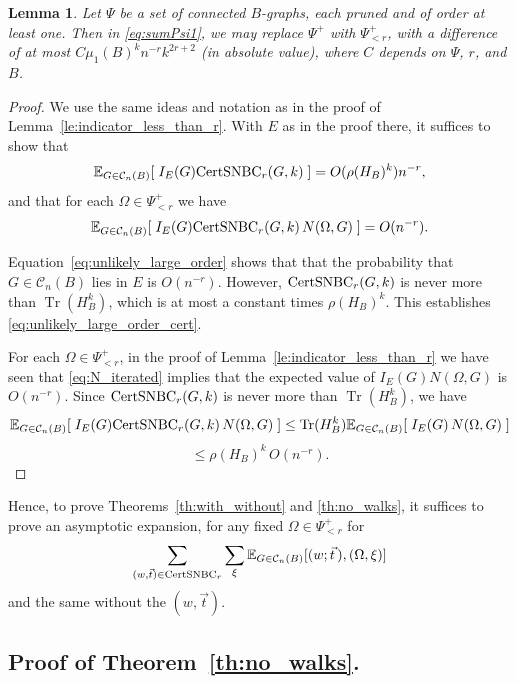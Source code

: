 \documentclass{memo-l}
\newcommand{\nonsigma}{\xi}
\theoremstyle{plain}
\theoremstyle{definition}
\numberwithin{section}{chapter}
\numberwithin{equation}{chapter}
\newcommand{\expect}[2]{{\mathbb{E}}_{#1}{\left[\; #2\; \right]}}
\DeclareMathOperator{\Tr}{Tr}
\newcommand{\potwalk}{(w;\vec t\,)}
\theoremstyle{plain}
\newtheorem{lem}[theorem]{Lemma}
\theoremstyle{definition}
\newcommand\EE{\mathbb{E}}
\newcommand\cC{\mathcal{C}}
\begin{document}
\begin{lem}\label{le:truncate_Psi_at_r}
Let \( \Psi \) be a set of connected 
\( B \)-graphs, each pruned and of order at
least one. 
Then in \eqref{eq:sumPsi1}, we may replace \( \Psi^+ \) with \(
\Psi^+_{<r} \), with a difference of at most \( C\mu_1(B)^k n^{-r}k^{2r+2} \)
(in absolute value),
where $C$ depends on $\Psi$, $r$, and $B$.
\end{lem} 
\begin{proof}
We use the same ideas and notation as in the proof
of Lemma~\ref{le:indicator_less_than_r}.  With $E$ as in the proof there,
it suffices to show that
\begin{equation}\label{eq:unlikely_large_order_cert}
\expect{G\in\cC_n(B)}{I_E(G) {\rm CertSNBC}_r(G,k) } = O(\rho(H_B)^k) n^{-r} ,
\end{equation}
and that for each $\Omega\in\Psi^+_{<r}$ we have
\begin{equation}\label{eq:unlikely_large_cert}
\expect{G\in\cC_n(B)}{I_E(G) {\rm CertSNBC}_r(G,k)\, N(\Omega,G) }
= O(n^{-r}).
\end{equation}

Equation~\ref{eq:unlikely_large_order} shows that
that the probability that $G\in\cC_n(B)$ lies in $E$ is
$O(n^{-r})$.  However, 
${\rm CertSNBC}_r(G,k)$ is never more than $\Tr(H_B^k)$, which
is at most a constant times $\rho(H_B)^k$.  This establishes
\eqref{eq:unlikely_large_order_cert}.

For each $\Omega\in\Psi^+_{<r}$, in the proof of
Lemma~\ref{le:indicator_less_than_r} we have seen that
\eqref{eq:N_iterated}
implies that the expected value of $I_E(G)N(\Omega,G)$ is $O(n^{-r})$.
Since ${\rm CertSNBC}_r(G,k)$ is never more than $\Tr(H_B^k)$,
we have
$$
\expect{G\in\cC_n(B)}{I_E(G) {\rm CertSNBC}_r(G,k)\, N(\Omega,G) }
\le
\Tr(H_B^k) 
\expect{G\in\cC_n(B)}{I_E(G) \, N(\Omega,G) }
$$
$$
\le
\rho(H_B)^k\, O(n^{-r}).
$$
\end{proof}


Hence, to prove Theorems~\ref{th:with_without} and \ref{th:no_walks}, it
suffices to prove an asymptotic expansion, for any fixed \(
\Omega\in\Psi^+_{<r} \) for \[ \sum_{(w,\vec t)\in {\rm CertSNBC}_r}
\sum_\nonsigma \EE_{G\in\cC_n(B)}[\potwalk,(\Omega,\nonsigma)] \] and the same without the
\( (w,\vec t) \).

\subsection{Proof of Theorem~\ref{th:no_walks}.}
\end{document}
